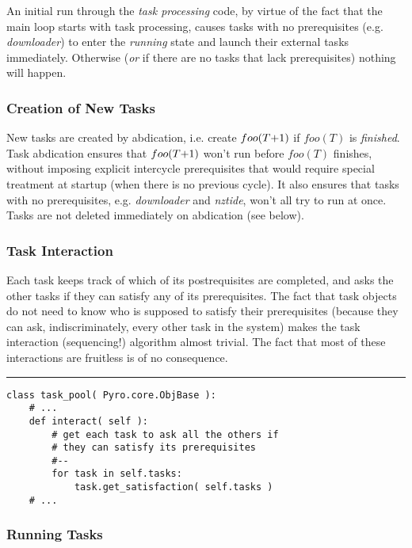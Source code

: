 \documentclass[11pt,a4paper]{article}
\begin{document}
An initial run through the {\em task processing} code, by virtue of the
fact that the main loop starts with task processing, causes tasks with
no prerequisites (e.g. {\em downloader}) to enter the {\em running}
state and launch their external tasks immediately. Otherwise ({\em or}
if there are no tasks that lack prerequisites) nothing will happen.



\subsubsection{Creation of New Tasks}

New tasks are created by abdication, i.e. create $foo(T\negmedspace
+\negmedspace 1)$ if $foo(T)$ is {\em finished}.  Task abdication
ensures that $foo(T\negmedspace +\negmedspace 1)$ won't run before
$foo(T)$ finishes, without imposing explicit intercycle prerequisites
that would require special treatment at startup (when there is no
previous cycle).  It also ensures that tasks with no prerequisites, e.g.
{\em downloader} and {\em nztide}, won't all try to run at once.
Tasks are not deleted immediately on abdication (see below).


\subsubsection{Task Interaction} 

Each task keeps track of which of its postrequisites are completed, and
asks the other tasks if they can satisfy any of its prerequisites.  The
fact that task objects do not need to know who is supposed to satisfy
their prerequisites (because they can ask, indiscriminately, every other
task in the system) makes the task interaction (sequencing!) algorithm
almost trivial. The fact that most of these interactions are fruitless
is of no consequence. 

{\small
\noindent
\rule{5cm}{.2mm}
\begin{lstlisting}
class task_pool( Pyro.core.ObjBase ):
    # ...
    def interact( self ):
        # get each task to ask all the others if 
        # they can satisfy its prerequisites
        #--
        for task in self.tasks:
            task.get_satisfaction( self.tasks )
    # ...
\end{lstlisting}
}

\subsubsection{Running Tasks}
\end{document}
